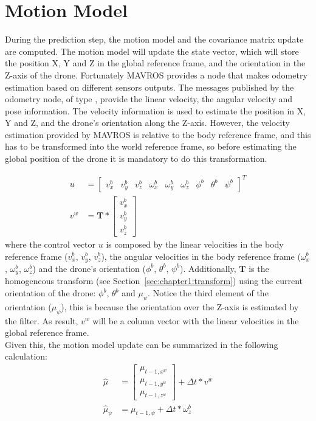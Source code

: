 \section{Motion Model}
\label{sec:chapter2:prediction}
During the prediction step, the motion model and the covariance matrix update are computed. The motion model will update the state vector, which will store the position X, Y and Z in the global reference frame, and the orientation in the Z-axis of the drone. Fortunately MAVROS provides a node that makes odometry estimation based on different sensors outputs. The messages published by the odometry node, of type , provide the linear velocity, the angular velocity and pose information. The velocity information is used to estimate the position in X, Y and Z, and the drone's orientation along the Z-axis. However, the velocity estimation provided by MAVROS is relative to the body reference frame, and this has to be transformed into the world reference frame, so before estimating the global position of the drone it is mandatory to do this transformation.

\begin{align}
    u &= \begin{bmatrix} v_x^b & v_y^b & v_z^b & \omega_x^b & \omega_y^b & \omega_z^b & \phi^b & \theta^b & \psi^b \end{bmatrix}^T\\
    v^w &= \textbf{T} * \begin{bmatrix} v_x^b \\ v_y^b \\ v_z^b \end{bmatrix}
\end{align}
where the control vector $u$ is composed by the linear velocities in the body reference frame ($v_x^b$, $v_y^b$, $v_z^b$), the angular velocities in the body reference frame ($\omega_x^b$, $\omega_y^b$, $\omega_z^b$) and the drone's orientation ($\phi^b$, $\theta^b$, $\psi^b$). Additionally, $\textbf{T}$ is the homogeneous transform (see Section~\ref{sec:chapter1:transform}) using the current orientation of the drone: $\phi^b$, $\theta^b$ and $\mu_{\psi}$. Notice the third element of the orientation ($\mu_{\psi}$), this is because the orientation over the Z-axis is estimated by the filter. As result, $v^w$ will be a column vector with the linear velocities in the global reference frame. \\

Given this, the motion model update can be summarized in the following calculation:
\begin{align}
    \hat\mu &=
    \begin{bmatrix}
        \mu_{t-1, x^w} \\ \mu_{t-1, y^w} \\ \mu_{t-1, z^w}
    \end{bmatrix}
    + \Delta t * v^w \\
    \hat\mu_{\psi} &= \mu_{t-1, \psi} + \Delta t * \omega_z^b
\end{align}

